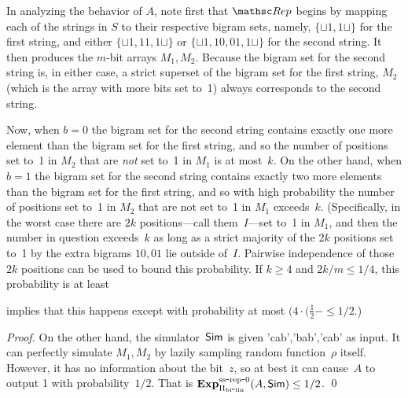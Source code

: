 In analyzing the behavior of $A$, note first that $\Rep$ begins by
mapping each of the strings in $S$ to their respective bigram sets,
namely, $\{\sqcup 1, 1\sqcup\}$ for the first string, and either
$\{\sqcup 1, 11, 1\sqcup\}$ or $\{\sqcup 1, 10, 01, 1\sqcup\}$ for
the second string. It then produces the $m$-bit arrays $M_1, M_2$.
Because the bigram set for the second string is, in either case, a
strict superset of the bigram set for the first string, $M_2$ (which
is the array with more bits set to~1) always corresponds to the
second string.

Now, when $b=0$ the bigram set for the second string contains
exactly one more element than the bigram set for the first string,
and so the number of positions set to~1 in $M_2$ that are \emph{not}
set to~1 in $M_1$ is at most~$k$. On the other hand, when $b=1$ the
bigram set for the second string contains exactly two more elements
than the bigram set for the first string, and so with high
probability the number of positions set to~1 in $M_2$ that are not
set to~1 in $M_1$ exceeds~$k$. (Specifically, in the worst case
there are $2k$ positions---call them~$I$---set to~1 in $M_1$, and
then the number in question exceeds~$k$ as long as a strict majority
of the $2k$ positions set to~1 by the extra bigrams $10, 01$ lie
outside of~$I$. Pairwise independence of those $2k$ positions can be
used to bound this probability. If $k\geq 4$ and $2k/m \leq 1/4$,
this probability is at least %

 implies that this happens except with
probability at most $(4 \cdot (\frac{1}{2}- \leq 1/2$.)

\begin{proof}%
On the other hand, the simulator~${\sf Sim}$ is given 'cab','bab','cab'
as input.  It can perfectly simulate $M_1,M_2$ by lazily sampling
random function~$\rho$ itself.  However, it has no information about
the bit~$z$, so at best it can cause~$A$ to output 1 with
probability~$1/2$.  That is
$\mathrm{\mathbf{Exp}}^{\mathrm{ss\mbox{-}rep\mbox{-}0}}_{\Pi_{\mathrm{bi}\mbox{-}\mathrm{lin}}}(A,{\sf Sim}) \leq 1/2$. \hfill\qed
\end{proof}




